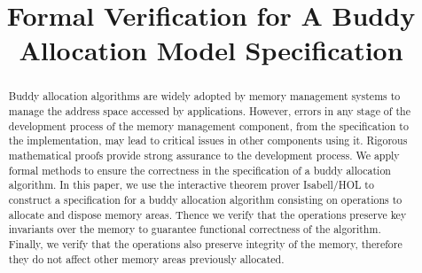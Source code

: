 \documentclass[runningheads]{llncs}
\begin{document}
\title{Formal Verification for A Buddy Allocation Model Specification}

\author{}

\institute{}

\maketitle


\begin{abstract}
Buddy allocation algorithms are widely adopted by memory management systems to manage the address space accessed by applications. However, errors in any stage of the development process of the memory management component, from the specification to the implementation, may lead to critical issues in other components using it. Rigorous mathematical proofs provide strong assurance to the development process. We apply formal methods to ensure the correctness in the specification of a buddy allocation algorithm. In this paper, we use the interactive theorem prover Isabell/HOL to construct a specification for a buddy allocation algorithm consisting on operations to allocate and dispose memory areas. Thence we verify that the operations preserve key invariants over the memory to guarantee functional correctness of the algorithm. Finally, we verify that the operations also preserve integrity of the memory, therefore they do not affect other memory areas previously allocated.

\end{abstract}
\end{document}
